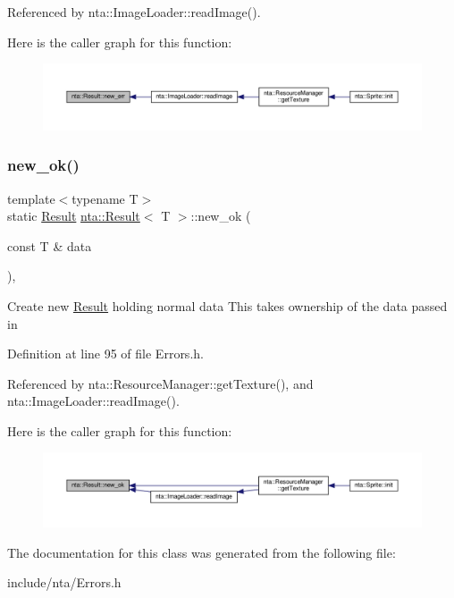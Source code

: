 Referenced by nta\+::\+Image\+Loader\+::read\+Image().

Here is the caller graph for this function\+:\nopagebreak
\begin{figure}[H]
\begin{center}
\leavevmode
\includegraphics[width=350pt]{d8/d2e/classnta_1_1Result_ad65a9140ae2a03cfb13bd30f848b1aa5_icgraph}
\end{center}
\end{figure}
\mbox{\label{classnta_1_1Result_af193a336ab789de94a975c6f0a039e40}} 
\subsubsection{\texorpdfstring{new\+\_\+ok()}{new\_ok()}}
{\footnotesize\ttfamily template$<$typename T$>$ \\
static \hyperlink{classnta_1_1Result}{Result} \hyperlink{classnta_1_1Result}{nta\+::\+Result}$<$ T $>$\+::new\+\_\+ok (\begin{DoxyParamCaption}\item[{const T \&}]{data }\end{DoxyParamCaption})\hspace{0.3cm}{\ttfamily [inline]}, {\ttfamily [static]}}

Create new \hyperlink{classnta_1_1Result}{Result} holding normal data This takes ownership of the data passed in 

Definition at line 95 of file Errors.\+h.



Referenced by nta\+::\+Resource\+Manager\+::get\+Texture(), and nta\+::\+Image\+Loader\+::read\+Image().

Here is the caller graph for this function\+:\nopagebreak
\begin{figure}[H]
\begin{center}
\leavevmode
\includegraphics[width=350pt]{d8/d2e/classnta_1_1Result_af193a336ab789de94a975c6f0a039e40_icgraph}
\end{center}
\end{figure}


The documentation for this class was generated from the following file\+:\begin{DoxyCompactItemize}
\item 
include/nta/Errors.\+h\end{DoxyCompactItemize}
